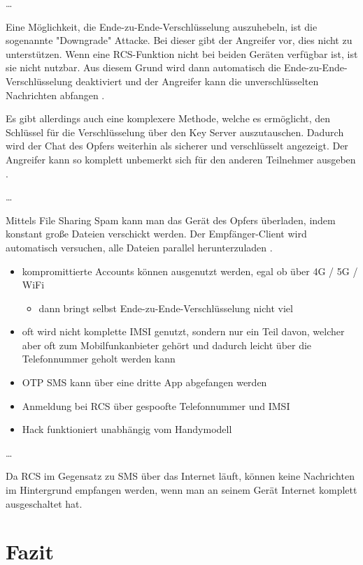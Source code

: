 \documentclass[conference]{IEEEtran}
\begin{document}
\dots

Eine Möglichkeit, die Ende-zu-Ende-Verschlüsselung auszuhebeln, ist die sogenannte "Downgrade" Attacke.
Bei dieser gibt der Angreifer vor, dies nicht zu unterstützen.
Wenn eine RCS-Funktion nicht bei beiden Geräten verfügbar ist, ist sie nicht nutzbar.
Aus diesem Grund wird dann automatisch die Ende-zu-Ende-Verschlüsselung deaktiviert und der Angreifer kann die unverschlüsselten Nachrichten abfangen \cite{5gmsg}.

Es gibt allerdings auch eine komplexere Methode, welche es ermöglicht, den Schlüssel für die Verschlüsselung über den Key Server auszutauschen.
Dadurch wird der Chat des Opfers weiterhin als sicherer und verschlüsselt angezeigt.
Der Angreifer kann so komplett unbemerkt sich für den anderen Teilnehmer ausgeben \cite{5gmsg}.

\dots

Mittels File Sharing Spam kann man das Gerät des Opfers überladen, indem konstant große Dateien verschickt werden.
Der Empfänger-Client wird automatisch versuchen, alle Dateien parallel herunterzuladen \cite{5gmsg}.

\begin{itemize}
    \item kompromittierte Accounts können ausgenutzt werden, egal ob über 4G / 5G / WiFi
          \begin{itemize}
              \item dann bringt selbst Ende-zu-Ende-Verschlüsselung nicht viel
          \end{itemize}
    \item oft wird nicht komplette IMSI genutzt, sondern nur ein Teil davon, welcher aber oft zum Mobilfunkanbieter gehört und dadurch leicht über die Telefonnummer geholt werden kann
    \item OTP SMS kann über eine dritte App abgefangen werden
    \item Anmeldung bei RCS über gespoofte Telefonnummer und IMSI
    \item Hack funktioniert unabhängig vom Handymodell
\end{itemize}
\cite{5gmsg}

\dots

Da RCS im Gegensatz zu SMS über das Internet läuft, können keine Nachrichten im Hintergrund empfangen werden, wenn man an seinem Gerät Internet komplett ausgeschaltet hat.

\section{Fazit}
\end{document}
